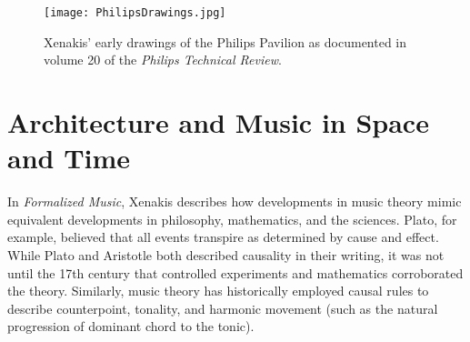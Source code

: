 \begin{figure*}[h]
  \texttt{[image: PhilipsDrawings.jpg]}
  \caption{Xenakis' early drawings of the Philips Pavilion as
    documented in volume 20 of the \textit{Philips Technical Review}.}
  \label{fig:xenakis-draw}
\end{figure*}

\section{Architecture and Music in Space and Time}
\label{sec:introduction-conclusion}

In \textit{Formalized Music}\cite{xenakis1992formalized}, Xenakis
describes how developments in music theory mimic equivalent
developments in philosophy, mathematics, and the sciences. Plato, for
example, believed that all events transpire as determined by cause and
effect. While Plato and Aristotle both described causality in their
writing, it was not until the 17th century that controlled experiments
and mathematics corroborated the theory.
Similarly, music theory has historically employed causal rules to
describe counterpoint, tonality, and harmonic movement (such as the
natural progression of dominant chord to the tonic).

